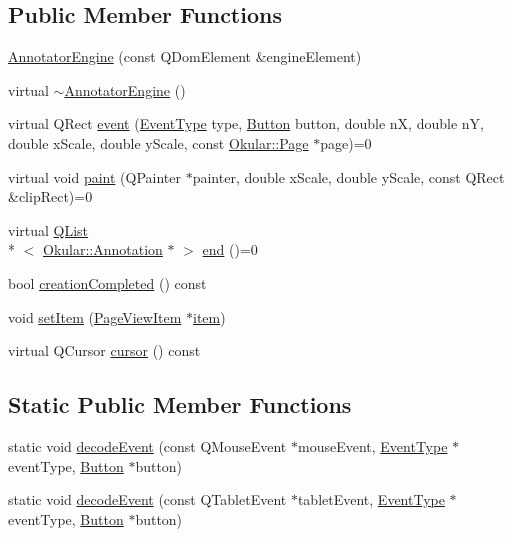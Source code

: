 \subsection*{Public Member Functions}
\begin{DoxyCompactItemize}
\item 
\hyperlink{classAnnotatorEngine_a42302fe858494d3e3ad90b8607c543ef}{Annotator\+Engine} (const Q\+Dom\+Element \&engine\+Element)
\item 
virtual \hyperlink{classAnnotatorEngine_a51954e14195933ce370de28c466ddddf}{$\sim$\+Annotator\+Engine} ()
\item 
virtual Q\+Rect \hyperlink{classAnnotatorEngine_acca989fc60f9a6c20ed2518fafa8774e}{event} (\hyperlink{classAnnotatorEngine_a00fb22eb4cb6eafb056f9066031db133}{Event\+Type} type, \hyperlink{classAnnotatorEngine_ac2e3b75e12bacbb6974d15dd53954567}{Button} button, double n\+X, double n\+Y, double x\+Scale, double y\+Scale, const \hyperlink{classOkular_1_1Page}{Okular\+::\+Page} $\ast$page)=0
\item 
virtual void \hyperlink{classAnnotatorEngine_a71b2e9fcbcca36caadefa79adb99c93f}{paint} (Q\+Painter $\ast$painter, double x\+Scale, double y\+Scale, const Q\+Rect \&clip\+Rect)=0
\item 
virtual \hyperlink{classQList}{Q\+List}\\*
$<$ \hyperlink{classOkular_1_1Annotation}{Okular\+::\+Annotation} $\ast$ $>$ \hyperlink{classAnnotatorEngine_a50455740303878b891195132df27a2ab}{end} ()=0
\item 
bool \hyperlink{classAnnotatorEngine_a54e1ac7803149f1a94490e5511ad3deb}{creation\+Completed} () const 
\item 
void \hyperlink{classAnnotatorEngine_aae312cd62f6fd4c9997a655d18de7385}{set\+Item} (\hyperlink{classPageViewItem}{Page\+View\+Item} $\ast$\hyperlink{classAnnotatorEngine_a67d46d5364e6f54e107ccbbb1ed07e32}{item})
\item 
virtual Q\+Cursor \hyperlink{classAnnotatorEngine_adec4c7612b59357c7b58aa81e3e3b212}{cursor} () const 
\end{DoxyCompactItemize}
\subsection*{Static Public Member Functions}
\begin{DoxyCompactItemize}
\item 
static void \hyperlink{classAnnotatorEngine_acabc5b26b0693eb5b29138a7a70f7a39}{decode\+Event} (const Q\+Mouse\+Event $\ast$mouse\+Event, \hyperlink{classAnnotatorEngine_a00fb22eb4cb6eafb056f9066031db133}{Event\+Type} $\ast$event\+Type, \hyperlink{classAnnotatorEngine_ac2e3b75e12bacbb6974d15dd53954567}{Button} $\ast$button)
\item 
static void \hyperlink{classAnnotatorEngine_aac61c2dd18f7a5c548d7844d0f096889}{decode\+Event} (const Q\+Tablet\+Event $\ast$tablet\+Event, \hyperlink{classAnnotatorEngine_a00fb22eb4cb6eafb056f9066031db133}{Event\+Type} $\ast$event\+Type, \hyperlink{classAnnotatorEngine_ac2e3b75e12bacbb6974d15dd53954567}{Button} $\ast$button)
\end{DoxyCompactItemize}

